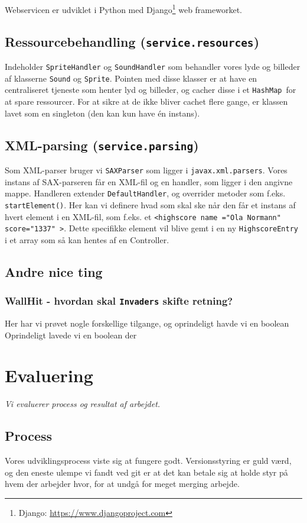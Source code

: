 \documentclass[titlepage,danish]{article}
\newcommand{\code}[1]{\texttt{#1}}
\begin{document}
Webservicen er udviklet i Python med Django\footnote{Django: \url{https://www.djangoproject.com}} web frameworket.

\subsection{Ressourcebehandling (\code{service.resources})}
Indeholder \code{SpriteHandler} og \code{SoundHandler} som behandler vores lyde og billeder af klasserne \code{Sound} og \code{Sprite}. Pointen med disse klasser er at have en centraliseret tjeneste som henter lyd og billeder, og cacher disse i et \code{HashMap}\ for at spare ressourcer. For at sikre at de ikke bliver cachet flere gange, er klassen lavet som en singleton (den kan kun have én instans).

\subsection{XML-parsing (\code{service.parsing})}
Som XML-parser bruger vi \code{SAXParser} som ligger i \code{javax.xml.parsers}. Vores instans af SAX-parseren får en XML-fil og en handler, som ligger i den angivne mappe. Handleren extender \code{DefaultHandler}, og overrider metoder som f.eks. \code{startElement()}. Her kan vi definere hvad som skal ske når den får et instans af hvert element i en XML-fil, som f.eks. et \code{\textless highscore name ="Ola Normann" score="1337" \textgreater}. Dette specifikke element vil blive gemt i en ny \code{HighscoreEntry} i et array som så kan hentes af en Controller.

\subsection{Andre nice ting}
\subsubsection{WallHit - hvordan skal \code{Invaders} skifte retning?}
Her har vi prøvet nogle forskellige tilgange, og oprindeligt havde vi en boolean
Oprindeligt lavede vi en boolean der

\section{Evaluering}
\emph{Vi evaluerer process og resultat af arbejdet.}
\subsection{Process}
Vores udviklingsprocess viste sig at fungere godt. Versionsstyring er guld værd, og den eneste
ulempe vi fandt ved git er at det kan betale sig at holde styr på hvem der arbejder hvor, for at
undgå for meget merging arbejde.
\end{document}
